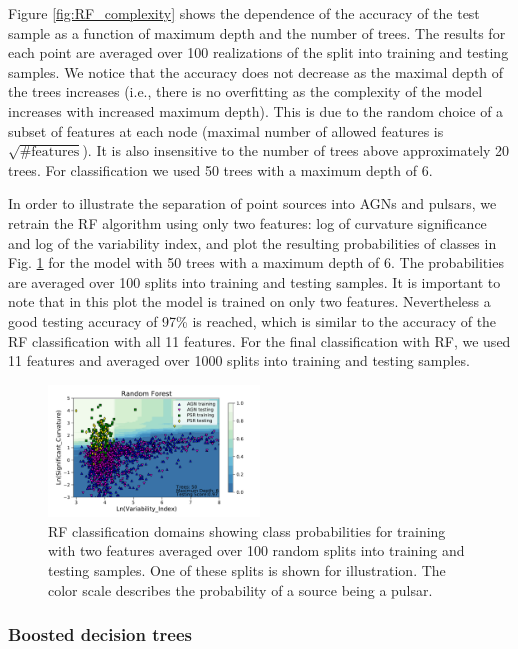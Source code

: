 \documentclass[referee]{aa} %
\begin{document}
Figure \ref{fig:RF_complexity} shows the dependence of the accuracy of the test sample as a function of maximum depth and the number of trees. 
The results for each point are averaged over 100 realizations of the split into training and testing samples.
We notice that the accuracy does not decrease as the maximal depth of the trees increases (i.e., there is no overfitting as the complexity of the model increases with increased maximum depth).
This is due to the random choice of a subset of features at each node (maximal number of allowed features is $\sqrt{\text{\# features}}$).
It is also insensitive to the number of trees above approximately 20 trees.
For classification we used 50 trees with a maximum depth of 6.


In order to illustrate the separation of point sources into AGNs and pulsars, we retrain the RF algorithm using only two features: log of curvature significance and log of the variability index, and plot the resulting probabilities of classes in Fig. \ref{fig:RF_domains}
for the model with 50 trees with a maximum depth of 6.
The probabilities are averaged over 100 splits into training and testing samples.
It is important to note that in this plot the model is trained on only two features. Nevertheless a good testing accuracy of 97\% is reached, 
which is similar to the accuracy of the RF classification with all 11 features.
For the final classification with RF, we used 11 features and averaged over 1000 splits into training and testing samples.

\begin{figure}[h]
\centering
\includegraphics[width=0.5\textwidth]{plots/classification_domains/rf_50_6_final.pdf}
\caption{RF classification domains showing class probabilities for training with two features
averaged over 100 random splits into training and testing samples.
One of these splits is shown for illustration.
The color scale describes the probability of a source being a pulsar.
}
\label{fig:RF_domains}
\end{figure}



\subsubsection{Boosted decision trees}
\end{document}
